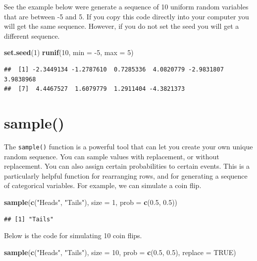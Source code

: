 \documentclass[
]{book}
\newenvironment{Shaded}{\begin{snugshade}}{\end{snugshade}}
\newcommand{\DataTypeTok}[1]{\textcolor[rgb]{0.13,0.29,0.53}{#1}}
\newcommand{\DecValTok}[1]{\textcolor[rgb]{0.00,0.00,0.81}{#1}}
\newcommand{\FloatTok}[1]{\textcolor[rgb]{0.00,0.00,0.81}{#1}}
\newcommand{\KeywordTok}[1]{\textcolor[rgb]{0.13,0.29,0.53}{\textbf{#1}}}
\newcommand{\NormalTok}[1]{#1}
\newcommand{\OtherTok}[1]{\textcolor[rgb]{0.56,0.35,0.01}{#1}}
\newcommand{\StringTok}[1]{\textcolor[rgb]{0.31,0.60,0.02}{#1}}
\begin{document}
See the example below were generate a sequence of 10 uniform random variables that are between -5 and 5. If you copy this code directly into your computer you will get the same sequence. However, if you do not set the seed you will get a different sequence.

\begin{Shaded}
\begin{Highlighting}[]
\KeywordTok{set.seed}\NormalTok{(}\DecValTok{1}\NormalTok{)}
\KeywordTok{runif}\NormalTok{(}\DecValTok{10}\NormalTok{, }\DataTypeTok{min =} \DecValTok{-5}\NormalTok{, }\DataTypeTok{max =} \DecValTok{5}\NormalTok{)}
\end{Highlighting}
\end{Shaded}

\begin{verbatim}
##  [1] -2.3449134 -1.2787610  0.7285336  4.0820779 -2.9831807  3.9838968
##  [7]  4.4467527  1.6079779  1.2911404 -4.3821373
\end{verbatim}

\hypertarget{sample}{%
\section{sample()}\label{sample}}

The \texttt{sample()} function is a powerful tool that can let you create your own unique random sequence. You can sample values with replacement, or without replacement. You can also assign certain probabilities to certain events. This is a particularly helpful function for rearranging rows, and for generating a sequence of categorical variables. For example, we can simulate a coin flip.

\begin{Shaded}
\begin{Highlighting}[]
\KeywordTok{sample}\NormalTok{(}\KeywordTok{c}\NormalTok{(}\StringTok{"Heads"}\NormalTok{, }\StringTok{"Tails"}\NormalTok{),}
    \DataTypeTok{size =} \DecValTok{1}\NormalTok{, }\DataTypeTok{prob =} \KeywordTok{c}\NormalTok{(}\FloatTok{0.5}\NormalTok{,}
        \FloatTok{0.5}\NormalTok{))}
\end{Highlighting}
\end{Shaded}

\begin{verbatim}
## [1] "Tails"
\end{verbatim}

Below is the code for simulating 10 coin flips.

\begin{Shaded}
\begin{Highlighting}[]
\KeywordTok{sample}\NormalTok{(}\KeywordTok{c}\NormalTok{(}\StringTok{"Heads"}\NormalTok{, }\StringTok{"Tails"}\NormalTok{),}
    \DataTypeTok{size =} \DecValTok{10}\NormalTok{, }\DataTypeTok{prob =} \KeywordTok{c}\NormalTok{(}\FloatTok{0.5}\NormalTok{,}
        \FloatTok{0.5}\NormalTok{), }\DataTypeTok{replace =} \OtherTok{TRUE}\NormalTok{)}
\end{Highlighting}
\end{Shaded}
\end{document}
